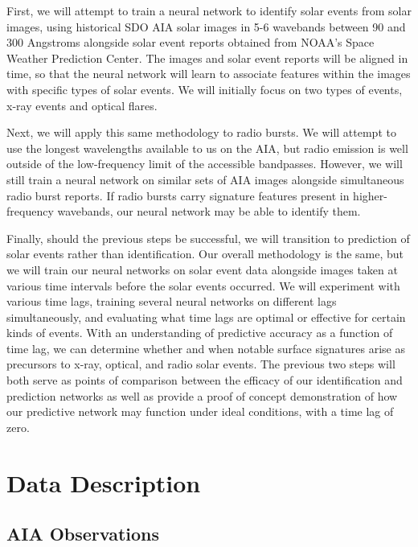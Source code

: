 \documentclass[12pt, letterpaper]{article}
\begin{document}
First, we will attempt to train a neural network to identify solar events from solar images, using historical SDO AIA solar images in 5-6 wavebands between 90 and 300 Angstroms alongside solar event reports obtained from NOAA's Space Weather Prediction Center. The images and solar event reports will be aligned in time, so that the neural network will learn to associate features within the images with specific types of solar events. We will initially focus on two types of events, x-ray events and optical flares. 

Next, we will apply this same methodology to radio bursts. We will attempt to use the longest wavelengths available to us on the AIA, but radio emission is well outside of the low-frequency limit of the accessible bandpasses. However, we will still train a neural network on similar sets of AIA images alongside simultaneous radio burst reports. If radio bursts carry signature features present in higher-frequency wavebands, our neural network may be able to identify them. 

Finally, should the previous steps be successful, we will transition to prediction of solar events rather than identification. Our overall methodology is the same, but we will train our neural networks on solar event data alongside images taken at various time intervals before the solar events occurred. We will experiment with various time lags, training several neural networks on different lags simultaneously, and evaluating what time lags are optimal or effective for certain kinds of events. With an understanding of predictive accuracy as a function of time lag, we can determine whether and when notable surface signatures arise as precursors to x-ray, optical, and radio solar events. The previous two steps will both serve as points of comparison between the efficacy of our identification and prediction networks as well as provide a proof of concept demonstration of how our predictive network may function under ideal conditions, with a time lag of zero. 


\section*{Data Description}

\subsection*{AIA Observations}
\end{document}
